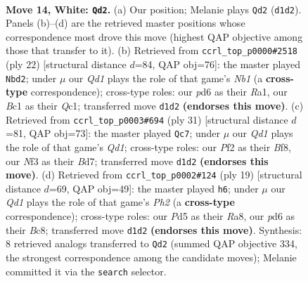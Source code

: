 \documentclass[11pt]{article}
\begin{document}
\clearpage

\begin{figure}[p]\centering
\begin{subfigure}{0.46\textwidth}\centering
\resizebox{\linewidth}{!}{%
\newchessgame
\chessboard[
  setfen={rnbqk2r/4b3/p2p4/1ppPpppp/8/1B1P1N1P/PPP2PP1/R1BQRK2 w kq c6 0 14},
  showmover=false,
  pgfstyle=straightmove, color=movearrow, markmove={d1-d2}
]}
\caption{}
\end{subfigure}\hfill
\begin{subfigure}{0.46\textwidth}\centering
\resizebox{\linewidth}{!}{%
\newchessgame
\chessboard[
  setfen={r1bqk2r/3n1pb1/1pp3pp/p1p1p3/P3P3/2BP1N1P/1PP2PP1/RNQ2RK1 w kq - 0 12},
  showmover=false,
  pgfstyle=straightmove, color=movearrow, markmove={b1-d2}
]}
\caption{}
\end{subfigure}
\\[4pt]
\begin{subfigure}{0.46\textwidth}\centering
\resizebox{\linewidth}{!}{%
\newchessgame
\chessboard[
  setfen={r2qrbk1/3b1pp1/p2p1n1p/npp5/P3P3/2P3NP/1PBN1PP1/R1BQR1K1 b - - 3 16},
  showmover=false,
  pgfstyle=straightmove, color=movearrow, markmove={d8-c7}
]}
\caption{}
\end{subfigure}\hfill
\begin{subfigure}{0.46\textwidth}\centering
\resizebox{\linewidth}{!}{%
\newchessgame
\chessboard[
  setfen={r1bq1rk1/pp2ppbp/3p1np1/2p4P/2PP4/2N1PBP1/PP3P2/R1BQK2R b KQ - 0 10},
  showmover=false,
  pgfstyle=straightmove, color=movearrow, markmove={h7-h6}
]}
\caption{}
\end{subfigure}
\caption{\textbf{Move 14, White: \texttt{Qd2}.} (a) Our position; Melanie plays \texttt{Qd2} (\texttt{d1d2}). Panels (b)--(d) are the retrieved master positions whose correspondence most drove this move (highest QAP objective among those that transfer to it). (b) Retrieved from \texttt{ccrl\_top\_p0000\#2518} (ply 22) [structural distance $d$=84, QAP obj=76]: the master played \texttt{Nbd2}; under $\mu$ our \emph{Qd1} plays the role of that game's \emph{Nb1} (a \textbf{cross-type} correspondence); cross-type roles: our \emph{p}d6 as their \emph{R}a1, our \emph{B}c1 as their \emph{Q}c1; transferred move \texttt{d1d2} \textbf{(endorses this move)}. (c) Retrieved from \texttt{ccrl\_top\_p0003\#694} (ply 31) [structural distance $d$=81, QAP obj=73]: the master played \texttt{Qc7}; under $\mu$ our \emph{Qd1} plays the role of that game's \emph{Qd1}; cross-type roles: our \emph{P}f2 as their \emph{B}f8, our \emph{N}f3 as their \emph{B}d7; transferred move \texttt{d1d2} \textbf{(endorses this move)}. (d) Retrieved from \texttt{ccrl\_top\_p0002\#124} (ply 19) [structural distance $d$=69, QAP obj=49]: the master played \texttt{h6}; under $\mu$ our \emph{Qd1} plays the role of that game's \emph{Ph2} (a \textbf{cross-type} correspondence); cross-type roles: our \emph{P}d5 as their \emph{R}a8, our \emph{p}d6 as their \emph{B}c8; transferred move \texttt{d1d2} \textbf{(endorses this move)}. Synthesis: 8 retrieved analogs transferred to \texttt{Qd2} (summed QAP objective 334, the strongest correspondence among the candidate moves); Melanie committed it via the \texttt{search} selector.}
\label{fig:thought-m26}
\end{figure}
\end{document}
